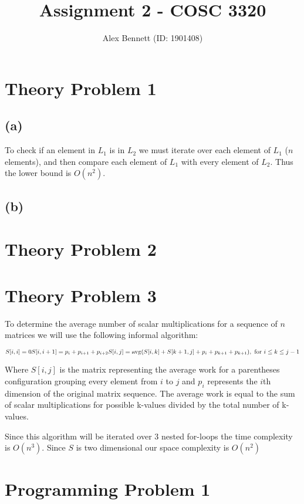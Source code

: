 \documentclass[11pt]{article}
\title{Assignment 2 - COSC 3320}
\author{Alex Bennett (ID: 1901408)}
\date{}
\begin{document}
\maketitle

\section*{Theory Problem 1}

\subsection*{(a)}
To check if an element in $L_1$ is in $L_2$ we must iterate over each element of $L_1$ ($n$ elements), and then compare each element of $L_1$ with every element of $L_2$. Thus the lower bound is $O(n^2)$.

\subsection*{(b)}

\section*{Theory Problem 2}

\section*{Theory Problem 3}

To determine the average number of scalar multiplications for a sequence of $n$ matrices we will use the following informal algorithm:

$ S[i,i] = 0 \\ S[i,i+1] = p_i + p_{i+1} + p_{i+2} \\
S[i,j] = \operatorname{avg}(S[i,k] + S[k+1,j] + p_i + p_{k+1} + p_{k+1}), \text{ for } i \leq k \leq j-1 $

Where $S[i,j]$ is the matrix representing the average work for a parentheses configuration grouping every element from $i$ to $j$ and $p_i$ represents the $i$th dimension of the original matrix sequence. The average work is equal to the sum of scalar multiplications for possible k-values divided by the total number of k-values.

Since this algorithm will be iterated over 3 nested for-loops the time complexity is $O(n^3)$. Since $S$ is two dimensional our space complexity is $O(n^2)$

\section*{Programming Problem 1}
\end{document}
